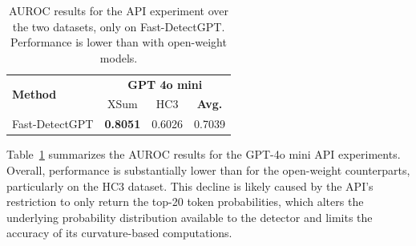 \documentclass[11pt]{article}
\begin{document}
\begin{table}[h]
    \centering
    \small
    \begin{tabular}{l|cc|c}
    \toprule
    \multirow{2}{*}{\textbf{Method}} & \multicolumn{3}{c}{\textbf{GPT 4o mini}} \\
    \cmidrule{2-4}
    & XSum & HC3 & \textbf{Avg.} \\
    \midrule
    Fast-DetectGPT & \textbf{0.8051} & 0.6026 & 0.7039 \\
    \bottomrule
    \end{tabular}
    \vspace{0.5em}
    \caption{AUROC results for the API experiment over the two datasets, only on Fast-DetectGPT. Performance is lower than with open-weight models.}
    \label{tab:API_results}
\end{table} 

Table~\ref{tab:API_results} summarizes the AUROC results for the GPT-4o mini API experiments. Overall, performance is substantially lower than for the open-weight counterparts, particularly on the HC3 dataset. This decline is likely caused by the API’s restriction to only return the top-20 token probabilities, which alters the underlying probability distribution available to the detector and limits the accuracy of its curvature-based computations.



\end{document}
